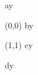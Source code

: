 \documentclass{article}
\begin{document}
\setlength{\parindent}{0pt}
\setlength{\parskip}{30pt}
\setlength{\baselineskip}{20pt}

%
%
%
%



\noindent ay
\vrule height 20pt depth 0pt width 0pt  %
\begin{textblock}{3}(0,0)
\noindent by
\end{textblock}
\begin{textblock}{2}(1,1)
\noindent cy
\end{textblock}
\noindent
dy

\end{document}
